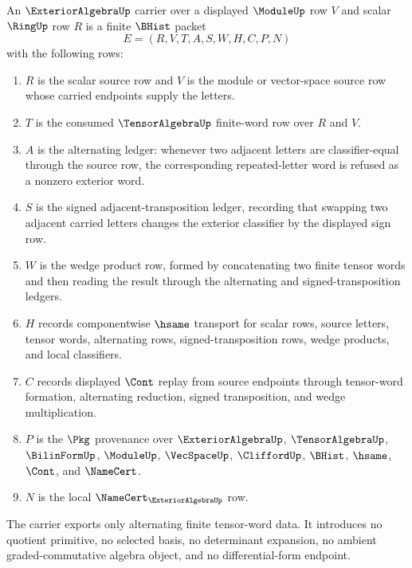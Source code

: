 \begin{definition}
\label{def:exterior-algebra-carrier}
An $\ExteriorAlgebraUp$ carrier over a displayed $\ModuleUp$ row $V$ and scalar $\RingUp$ row $R$ is a finite $\BHist$ packet
$$
E=(R,V,T,A,S,W,H,C,P,N)
$$
with the following rows:
\begin{enumerate}
\item $R$ is the scalar source row and $V$ is the module or vector-space source row whose carried endpoints supply the letters.
\item $T$ is the consumed $\TensorAlgebraUp$ finite-word row over $R$ and $V$.
\item $A$ is the alternating ledger: whenever two adjacent letters are classifier-equal through the source row, the corresponding repeated-letter word is refused as a nonzero exterior word.
\item $S$ is the signed adjacent-transposition ledger, recording that swapping two adjacent carried letters changes the exterior classifier by the displayed sign row.
\item $W$ is the wedge product row, formed by concatenating two finite tensor words and then reading the result through the alternating and signed-transposition ledgers.
\item $H$ records componentwise $\hsame$ transport for scalar rows, source letters, tensor words, alternating rows, signed-transposition rows, wedge products, and local classifiers.
\item $C$ records displayed $\Cont$ replay from source endpoints through tensor-word formation, alternating reduction, signed transposition, and wedge multiplication.
\item $P$ is the $\Pkg$ provenance over $\ExteriorAlgebraUp$, $\TensorAlgebraUp$, $\BilinFormUp$, $\ModuleUp$, $\VecSpaceUp$, $\CliffordUp$, $\BHist$, $\hsame$, $\Cont$, and $\NameCert$.
\item $N$ is the local $\NameCert_{\ExteriorAlgebraUp}$ row.
\end{enumerate}
The carrier exports only alternating finite tensor-word data. It introduces no quotient primitive, no selected basis, no determinant expansion, no ambient graded-commutative algebra object, and no differential-form endpoint.
\end{definition}

